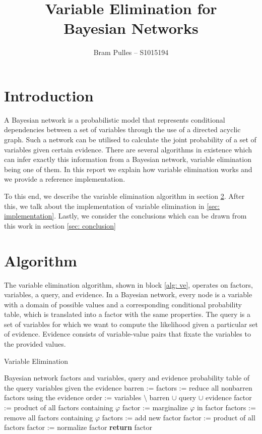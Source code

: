 \documentclass[a4paper]{article}
\author{Bram Pulles -- S1015194}
\title{\textbf{Variable Elimination for\\Bayesian Networks}}
\begin{document}
\maketitle

\tableofcontents

\pagebreak
\section{Introduction}
A Bayesian network is a probabilistic model that represents conditional
dependencies between a set of variables through the use of a directed acyclic
graph. Such a network can be utilised to calculate the joint probability of a
set of variables given certain evidence. There are several algorithms in
existence which can infer exactly this information from a Bayesian network,
variable elimination being one of them. In this report we explain how variable
elimination works and we provide a reference implementation.

To this end, we describe the variable elimination algorithm in section
\ref{sec: variable elimination}. After this, we talk about the implementation
of variable elimination in \ref{sec: implementation}. Lastly, we consider the
conclusions which can be drawn from this work in section \ref{sec: conclusion}

\section{Algorithm}\label{sec: variable elimination}
The variable elimination algorithm, shown in block \ref{alg: ve}, operates on
factors, variables, a query, and evidence. In a Bayesian network, every node is
a variable with a domain of possible values and a corresponding conditional
probability table, which is translated into a factor with the same properties.
The query is a set of variables for which we want to compute the likelihood
given a particular set of evidence. Evidence consists of variable-value pairs
that fixate the variables to the provided values.

\begin{algorithm}
	\caption{Variable Elimination}
	\label{alg: ve}
	\begin{algorithmic}[1]
		\Require Bayesian network factors and variables, query and evidence
		\Ensure probability table of the query variables given the evidence
			\State barren := 
			\State factors := reduce all nonbarren factors using the evidence
			\State order := variables $\setminus$ barren $\cup$ query $\cup$ evidence
				\State factor := product of all factors containing $\varphi$
				\State factor := marginalize $\varphi$ in factor
				\State factors := remove all factors containing $\varphi$
				\State factors := add new factor
			\EndFor
			\State factor := product of all factors
			\State factor := normalize factor
			\State \textbf{return} factor
		\EndFunction
	\end{algorithmic}
\end{algorithm}
\end{document}
